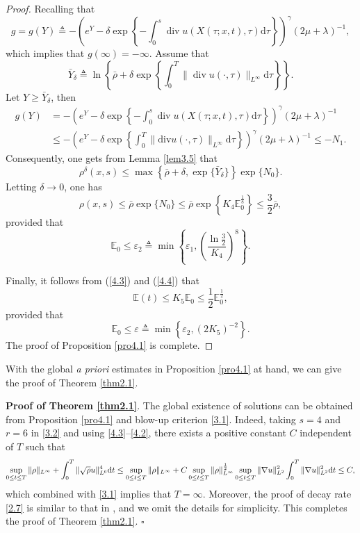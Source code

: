 \documentclass[11pt]{article}
\DeclareMathOperator{\divv}{div}
\begin{document}
\begin{proof}
Recalling that
$$
g = g (Y) \triangleq - \left(e^{Y} - \delta \exp\left\{- \int^s_0 \divv u \left(X(\tau;x,t), \tau \right) \mathrm{d} \tau \right\} \right)^{\gamma} \left( 2 \mu + \lambda \right)^{-1},
$$
which implies that $g(\infty ) = - \infty $. Assume that
$$
\bar{Y}_{\delta} \triangleq \ln \left\{ \bar{\rho} + \delta \exp\left\{\int^T_0 \|\divv u(\cdot,\tau)\|_{L^{\infty }} \mathrm{d} \tau \right\} \right\}.
$$
Let $Y \geq \bar{Y}_{\delta}$, then
$$
\begin{aligned}
g(Y)
& = - \left(e^{Y} - \delta \exp\left\{- \int^s_0 \divv u \left(X(\tau;x,t), \tau \right) \mathrm{d} \tau \right\} \right)^{\gamma} \left( 2 \mu + \lambda \right)^{-1}\\
& \leq - \left(e^{Y} - \delta \exp\left\{\int^T_0 \|\mathrm{div} u (\cdot,\tau)\|_{L^{\infty }} \mathrm{d} \tau \right\} \right)^{\gamma} \left( 2 \mu + \lambda \right)^{-1} \leq - N_1.
\end{aligned}
$$
Consequently, one gets from Lemma \ref{lem3.5} that
$$
\rho^{\delta} (x, s) \leq \max\left\{ \bar{\rho} + \delta, \exp\{\bar{Y}_{\delta} \}\right\} \exp\{N_0\}.
$$
Letting $\delta \rightarrow 0$, one has
$$
\rho(x,s) \leq \bar{\rho} \exp\{N_0\} \leq \bar{\rho} \exp\left\{K_4 \mathbb{E}_0^{\frac{1}{8}}\right\} \leq \frac{3}{2} \bar{\rho},
$$
provided that
$$
\mathbb{E}_0 \leq \varepsilon_2 \triangleq \min \left\{\varepsilon_1,  \left(\frac{ \ln \frac{3}{2}}{K_4} \right)^8\right\}.
$$

Finally, it follows from (\ref{4.3}) and (\ref{4.4}) that
$$
\mathbb{E} (t) \leq K_5 \mathbb{E}_0 \leq \frac{1}{2} \mathbb{E}_0^{\frac{1}{2}},
$$
provided that
$$
\mathbb{E}_0 \leq \varepsilon \triangleq \min \left\{\varepsilon_2, (2 K_5)^{-2} \right\}.
$$
The proof of Proposition \ref{pro4.1} is complete.
\end{proof}

With the global {\it a priori} estimates in Proposition \ref{pro4.1} at hand, we can give the proof of Theorem \ref{thm2.1}.

{\bf Proof of Theorem \ref{thm2.1}}. The global existence of solutions can be obtained from Proposition \ref{pro4.1} and blow-up criterion \eqref{3.1}.
Indeed, taking $s=4$ and $r=6$ in \eqref{3.2} and using \eqref{4.3}--\eqref{4.2}, there exists a positive constant $C$ independent of $T$ such that
$$
\sup_{0\leq t\leq T} \|\rho\|_{L^\infty} + \int_{0}^T \|\sqrt{\rho}u\|_{L^6}^4 {\rm d} t \le \sup_{0\leq t\leq T} \|\rho\|_{L^\infty} + C \sup_{0\leq t\leq T} \|\rho\|_{L^\infty}^{\frac12} \sup_{0\leq t\leq T} \|\nabla u\|_{L^2}^{2}
\int_{0}^T \|\nabla u\|_{L^2}^{2}{\rm d}t \le C,
$$
which combined with \eqref{3.1} implies that $T=\infty$. Moreover, the proof of decay rate  \eqref{2.7} is similar to that in \cite{LX2019}, and we omit the details for simplicity.
This completes the proof of Theorem \ref{thm2.1}.
\hfill$\square$
\end{document}
